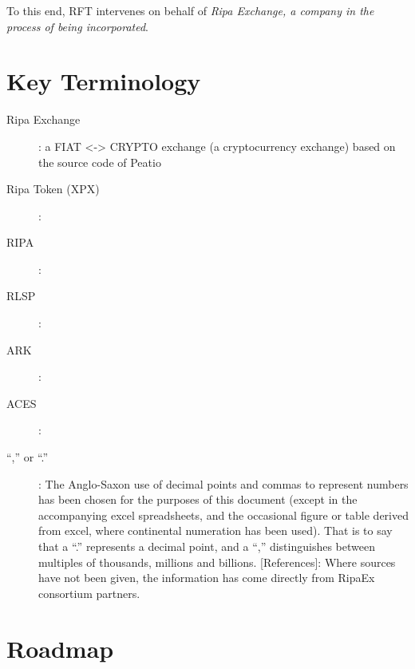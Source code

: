 \documentclass[11pt,fleqn,oneside]{book} %
\begin{document}
To this end, RFT intervenes on behalf of \emph{Ripa Exchange, a company in the process of being incorporated}.





\section{Key Terminology}
\begin{description}
	\item[Ripa Exchange]: a FIAT <-> CRYPTO exchange (a cryptocurrency exchange) based on the source code
	of Peatio \cite{peatio}
	\item[Ripa Token (XPX)]: \lipsum[1]
	\item[RIPA]: \lipsum[1]
    \item[RLSP]: \lipsum[3]
	\item[ARK]: \lipsum[4]
    \item[ACES]: \lipsum[5]
    \item[“,” or “.”]: The Anglo-Saxon use of decimal points and commas to represent numbers has
been chosen for the purposes of this document (except in the accompanying excel
spreadsheets, and the occasional figure or table derived from excel, where continental
numeration has been used). That is to say that a “.” represents a decimal point, and a “,”
distinguishes between multiples of thousands, millions and billions.
[References]: Where sources have not been given, the information has come directly from
RipaEx consortium partners.
    \end{description}


\section{Roadmap}
\lipsum[1-2]
\end{document}

